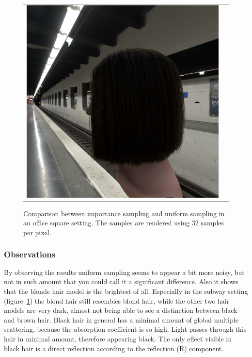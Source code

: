 \documentclass[11pt,a4paper]{report}
\begin{document}
\begin{figure}[h]
\begin{center}
\begin{tabular}{cc}
\includegraphics[scale=0.16]{realworld/subway/uniform_brown2_32.png} \\

\end{tabular}
\caption{Comparison between importance sampling and uniform sampling in an office square setting. The samples are rendered using 32 samples per pixel.}
\label{fig_subway}
\end{center}
\end{figure}

\subsubsection{Observations}

By observing the results uniform sampling seems to appear a bit more noisy, but not in such amount that you could call it a significant difference. Also it shows that the blonde hair model is the brightest of all. Especially in the subway setting (figure~\ref{fig_subway}) the blond hair still resembles blond hair, while the other two hair models are very dark, almost not being able to see a distinction between black and brown hair.
Black hair in general has a minimal amount of global multiple scattering, because the absorption coefficient is so high. Light passes through this hair in minimal amount, therefore appearing black. The only effect visible in black hair is a direct reflection according to the reflection (R) component.
\end{document}
